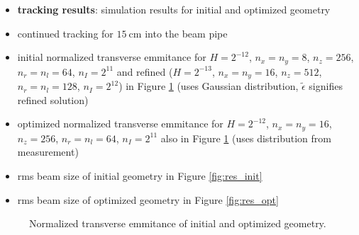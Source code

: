 %       
%       

\newpage

\begin{itemize}
   \item \textbf{tracking results}: simulation results for initial and optimized geometry
   \item continued tracking for $15\ \mathrm{cm}$ into the beam pipe
   \item initial normalized transverse emmitance for $H=2^{-12}$, $n_x=n_y=8$, $n_z=256$, $n_r=n_l=64$, $n_I=2^{11}$ and refined ($H=2^{-13}$, $n_x=n_y=16$, $n_z=512$, $n_r=n_l=128$, $n_I=2^{12}$) in Figure \ref{fig:res_eps} (uses Gaussian distribution, $\tilde{\epsilon}$ signifies refined solution)
   \item optimized normalized transverse emmitance for $H=2^{-12}$, $n_x=n_y=16$, $n_z=256$, $n_r=n_l=64$, $n_I=2^{11}$ also in Figure \ref{fig:res_eps} (uses distribution from measurement)
   \item rms beam size of initial geometry in Figure \ref{fig:res_init}
   \item rms beam size of optimized geometry in Figure \ref{fig:res_opt}
\end{itemize}

\begin{center}
\begin{figure}[H]
   \begin{subfigure}{0.4\textwidth}
      
   \end{subfigure}
   \qquad \qquad \qquad
   \begin{subfigure}{0.4\textwidth}
      
   \end{subfigure}
   \caption{Normalized transverse emmitance of initial and optimized geometry.}
   \label{fig:res_eps}
\end{figure}
\end{center}

